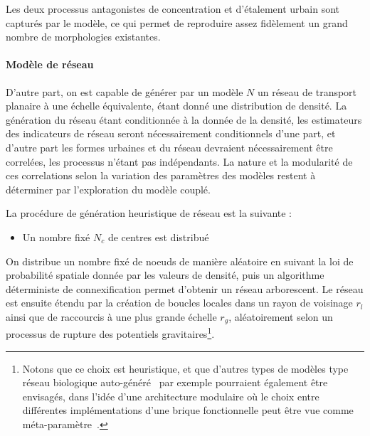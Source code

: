 Les deux processus antagonistes de concentration et d'étalement urbain sont capturés par le modèle, ce qui permet de reproduire assez fidèlement un grand nombre de morphologies existantes.


\paragraph{Modèle de réseau}

D'autre part, on est capable de générer par un modèle $N$ un réseau de transport planaire à une échelle équivalente, étant donné une distribution de densité. La génération du réseau étant conditionnée à la donnée de la densité, les estimateurs des indicateurs de réseau seront nécessairement conditionnels d'une part, et d'autre part les formes urbaines et du réseau devraient nécessairement être correlées, les processus n'étant pas indépendants. La nature et la modularité de ces correlations selon la variation des paramètres des modèles restent à déterminer par l'exploration du modèle couplé.

La procédure de génération heuristique de réseau est la suivante :
\begin{itemize}
\item Un nombre fixé $N_c$ de centres est distribué 

\end{itemize}

On distribue un nombre fixé de noeuds de manière aléatoire en suivant la loi de probabilité spatiale donnée par les valeurs de densité, puis un algorithme déterministe de connexification permet d'obtenir un réseau arborescent. Le réseau est ensuite étendu par la création de boucles locales dans un rayon de voisinage $r_l$ ainsi que de raccourcis à une plus grande échelle $r_g$, aléatoirement selon un processus de rupture des potentiels gravitaires\footnote{Notons que ce choix est heuristique, et que d'autres types de modèles type réseau biologique auto-généré~\cite{tero2006physarum} par exemple pourraient également être envisagés, dans l'idée d'une architecture modulaire où le choix entre différentes implémentations d'une brique fonctionnelle peut être vue comme méta-paramètre~\cite{cottineau2015incremental}.}.







